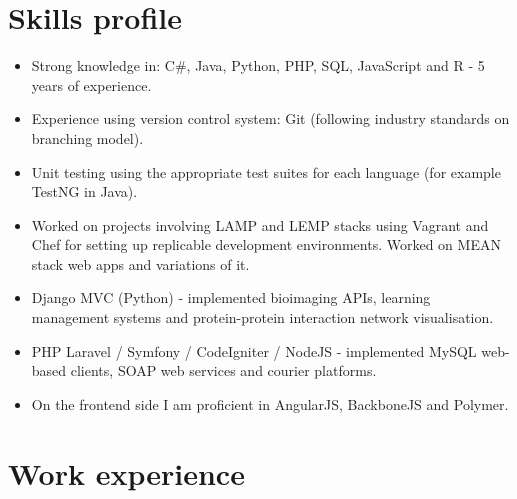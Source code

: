 \documentclass[11pt,a4paper,sans]{moderncv}        %
\begin{document}
\section{Skills profile}
{
\begin{itemize}
\item Strong knowledge in: C\#, Java, Python, PHP, SQL, JavaScript and R - 5 years of experience.
\item Experience using version control system: Git (following industry standards on branching model).
\item Unit testing using the appropriate test suites for each language (for example TestNG in Java).
\item Worked on projects involving LAMP and LEMP stacks using Vagrant and Chef for setting up replicable development environments. Worked on MEAN stack web apps and variations of it.
\end{itemize}
}
{
\begin{itemize}
\item Django MVC (Python) - implemented bioimaging APIs, learning management systems and protein-protein interaction network visualisation.
\item PHP Laravel / Symfony / CodeIgniter / NodeJS - implemented MySQL web-based clients, SOAP web services and courier platforms.
\item On the frontend side I am proficient in AngularJS, BackboneJS and Polymer.
\end{itemize}
}

\section{Work experience}
\end{document}
